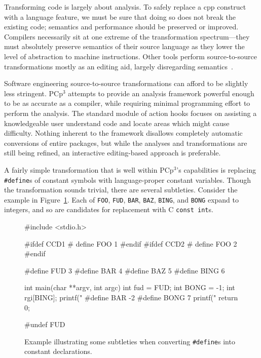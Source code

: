 \documentclass{article}
\newcommand{\pcp}{\mbox{\textsf{PCp}$^3$}}
\newcommand{\Cpp}{\mbox{\textsf{cpp}}}
\newcommand{\C}{\mbox{\textsf{C}}}
\newcommand{\ppd}[1]{\texttt{\##1}}
\newcommand{\figref}[1]{Figure~\ref{#1}}
\begin{document}
Transforming code is largely about analysis.  To safely replace a \Cpp{}
construct with a language feature, we must be sure that doing so does
not break the existing code;  semantics and performance should be
preserved or improved.  Compilers necessarily sit at one extreme of the
transformation spectrum---they must absolutely preserve semantics of
their source language as they lower the level of abstraction to machine
instructions.  Other tools perform source-to-source transformations
mostly as an editing aid, largely disregarding semantics~\cite{C2J,C2JPP}.

Software engineering source-to-source transformations can afford to be
slightly less stringent.  \pcp{} attempts to provide an analysis
framework powerful enough to be as accurate as a compiler, while
requiring minimal programming effort to perform the analysis.  The
standard module of action hooks focuses on assisting a knowledgeable
user understand code and locate areas which might cause difficulty.
Nothing inherent to the framework disallows completely automatic
conversions of entire packages, but while the analyses and
transformations are still being refined, an interactive editing-based
approach is preferable.

A fairly simple transformation that is well within \pcp{}'s capabilities
is replacing \ppd{define}s of constant symbols with language-proper
constant variables.  Though the transformation sounds trivial, there are
several subtleties.  Consider the example in
\figref{fig:def_example}.  Each of \texttt{FOO}, \texttt{FUD},
\texttt{BAR}, \texttt{BAZ}, \texttt{BING}, and \texttt{BONG} expand to
integers, and so are candidates for replacement with \C{} \texttt{const
  int}s.

\begin{figure}[htbp]
\begin{center}
\begin{small}
\begin{pseudocode}[4.5in]
#include <stdio.h>

#ifdef CCD1
#  define FOO 1
#endif
#ifdef CCD2
#  define FOO 2
#endif

#define FUD 3
#define BAR 4
#define BAZ 5
#define BING 6

int main(char **argv, int argc) {
  int fud = FUD;
  int BONG = -1;
  int rgi[BING];
  printf("%
#define BAR -2
#define BONG 7
  printf("%
  return 0;
}

#undef FUD
\end{pseudocode}
\end{small}
\caption{Example illustrating some subtleties when converting \ppd{define}s
  into constant declarations.}
\label{fig:def_example}
\end{center}
\end{figure}
\end{document}
